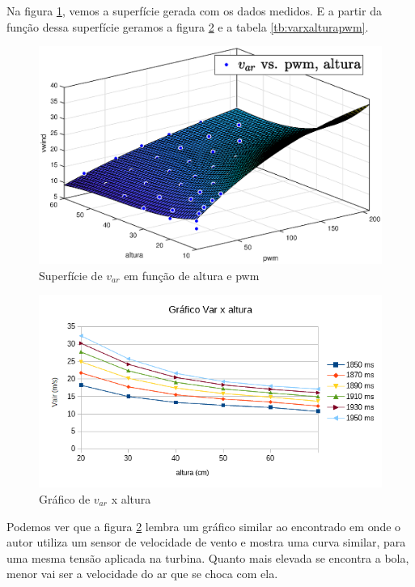 Na figura \ref{fig:curvavar}, vemos a superfície gerada com os dados medidos. E a partir da função dessa superfície geramos a figura \ref{fig:graficovairaltura1} e a tabela \ref{tb:varxalturapwm}.

\begin{figure}[htb]
	\centering
	\includegraphics[width=1\linewidth]{pasta1_figuras/curvavar}
	\caption[Superfície de $v_{ar}$ em função de altura e pwm]{Superfície de $v_{ar}$ em função de altura e pwm}
	\label{fig:curvavar}
\end{figure}


\begin{figure}[htb]
	\centering
	\includegraphics[width=1\linewidth]{grafico_vair_altura}
	\caption[Gráfico $v_{ar}$ x altura]{Gráfico de $v_{ar}$ x altura}
	\label{fig:graficovairaltura1}
\end{figure}

Podemos ver que a figura \ref{fig:graficovairaltura1} lembra um gráfico similar ao encontrado em \cite{jernigan2009} onde o autor utiliza um sensor de velocidade de vento e mostra uma curva similar, para uma mesma tensão aplicada na turbina. Quanto mais elevada se encontra a bola, menor vai ser a velocidade do ar que se choca com ela.

